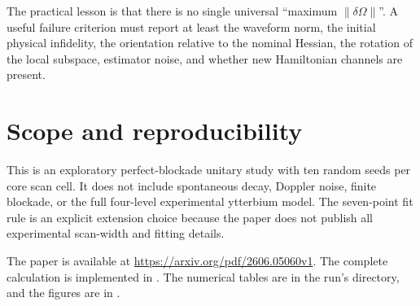 \documentclass[11pt]{article}
\newcommand{\dOm}{\delta\Omega}
\begin{document}
The practical lesson is that there is no single universal ``maximum
$\|\dOm\|$''.  A useful failure criterion must report at least the waveform
norm, the initial physical infidelity, the orientation relative to the
nominal Hessian, the rotation of the local subspace, estimator noise, and
whether new Hamiltonian channels are present.

\section{Scope and reproducibility}

This is an exploratory perfect-blockade unitary study with ten random seeds
per core scan cell.  It does not include spontaneous decay, Doppler noise,
finite blockade, or the full four-level experimental ytterbium model.
The seven-point fit rule is an explicit extension choice because the paper
does not publish all experimental scan-width and fitting details.

The paper is available at
\url{https://arxiv.org/pdf/2606.05060v1}.
The complete calculation is implemented in
.
The numerical tables are in the run's  directory, and the
figures are in .
\end{document}
